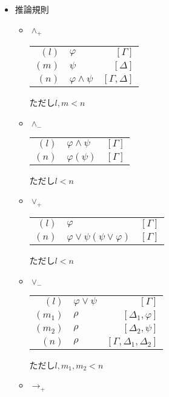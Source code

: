 \documentclass[10pt,b5paper,papersize,dvipdfmx]{jsbook}
\begin{document}
\begin{itemize}
\item 推論規則
\begin{itemize}
\item $\land_+$
\begin{table}[H]
\begin{center}
\begin{tabular}{rlr}
$(l)$&$\varphi$&$[\Gamma]$ \\
$(m)$&$\psi$&$[\Delta]$ \\
$(n)$&$\varphi \land \psi$&$[\Gamma,\Delta]$
\end{tabular}
\end{center}
\end{table}
ただし$l,m<n$
\item $\land_-$
\begin{table}[H]
\begin{center}
\begin{tabular}{rlr}
$(l)$&$\varphi \land \psi$&$[\Gamma]$ \\
$(n)$&$\varphi (\psi)$&$[\Gamma]$ \\
\end{tabular}
\end{center}
\end{table}
ただし$l<n$
\item $\lor_+$
\begin{table}[H]
\begin{center}
\begin{tabular}{rlr}
$(l)$&$\varphi$&$[\Gamma]$ \\
$(n)$&$\varphi \lor \psi (\psi \lor \varphi)$&$[\Gamma]$
\end{tabular}
\end{center}
\end{table}
ただし$l<n$
\item $\lor_-$
\begin{table}[H]
\begin{center}
\begin{tabular}{rlr}
$(l)$&$\varphi \lor \psi$&$[\Gamma]$ \\
$(m_1)$&$\rho$&$[\Delta_1,\varphi]$ \\
$(m_2)$&$\rho$&$[\Delta_2,\psi]$ \\
$(n)$&$\rho$&$[\Gamma,\Delta_1,\Delta_2]$
\end{tabular}
\end{center}
\end{table}
ただし$l,m_1,m_2<n$
\item $\to_+$
\begin{table}[H]

\end{table}
\end{itemize}
\end{itemize}
\end{document}
